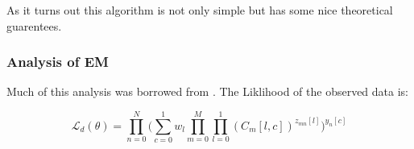 As it turns out this algorithm is not only simple but has some nice theoretical guarentees.

\subsubsection{Analysis of EM}
Much of this analysis was borrowed from \cite{murphy2012machine}. The Liklihood of the observed data is:

\begin{equation}  \label{eq:observedL}
\mathcal{L}_{d}(\theta) =
\displaystyle\prod\limits_{n=0}^{N} \Big ( \displaystyle\sum\limits_{c=0}^{1}
w_{l} \displaystyle\prod\limits_{m=0}^{M} \displaystyle\prod\limits_{l=0}^{1} (C_{m}[l,c])^{z_{mn}[l]} \Big )^{y_{n}[c]}
\end{equation}

